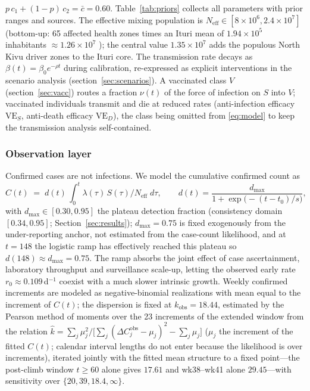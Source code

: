 \documentclass[preprint,12pt,numbers]{elsarticle}
\begin{document}
$p\,c_1+(1-p)\,c_2=\bar c=0.60$. Table~\ref{tab:priors} collects all
parameters with prior ranges and sources. The effective mixing
population is $N_{\mathrm{eff}}\in[8\times10^6,2.4\times10^7]$
(bottom-up: 65 affected health zones times an Ituri mean of
$1.94\times10^5$ inhabitants $\approx1.26\times10^7$
\cite{SSHAP2026,KhethImpilo2026}); the central value $1.35\times10^7$
adds the populous North Kivu driver zones to the Ituri core. The
transmission rate decays as $\beta(t)=\beta_0 e^{-\rho t}$ during
calibration, re-expressed as explicit interventions in the scenario
analysis (section~\ref{sec:scenarios}). A vaccinated class $V$
(section~\ref{sec:vacc}) routes a fraction $\nu(t)$ of the force of
infection on $S$ into $V$; vaccinated individuals transmit and die at
reduced rates (anti-infection efficacy $\mathrm{VE}_S$, anti-death
efficacy $\mathrm{VE}_D$), the class being omitted from \eqref{eq:model}
to keep the transmission analysis self-contained.
\subsubsection{Observation layer}\label{sec:obsmodel}

Confirmed cases are not infections. We model the cumulative confirmed
count as
\begin{equation}\label{eq:obs}
C(t) \;=\; d(t)\,\textstyle\int_0^t \lambda(\tau)\, S(\tau)/N_{\mathrm{eff}}\;d\tau, \qquad
d(t) = \frac{d_{\max}}{1+\exp\!\big(-(t-t_0)/s\big)},
\end{equation}
with $d_{\max}\in[0.30,0.95]$ the plateau detection fraction
(consistency domain $[0.34,0.95]$; Section~\ref{sec:results}); $d_{\max}=0.75$
is fixed exogenously from the under-reporting anchor, not estimated from the
case-count likelihood, and at $t=148$ the logistic ramp has effectively reached
this plateau so $d(148)\approx d_{\max}=0.75$. The ramp
absorbs the joint effect of case ascertainment, laboratory throughput
and surveillance scale-up, letting the observed early rate
$r_0\approx0.109\,$d$^{-1}$ coexist with a much slower intrinsic growth.
Weekly confirmed increments are modeled as negative-binomial realizations
with mean equal to the increment of $C(t)$; the dispersion is fixed at
$k_{\mathrm{obs}}=18.44$, estimated by the Pearson method of moments over
the 23 increments of the extended window from the relation
$\hat k=\sum_j\mu_j^2\big/\bigl[\sum_j(\Delta C_j^{\mathrm{obs}}-\mu_j)^2-\sum_j\mu_j\big]$
($\mu_j$ the increment of the fitted $C(t)$; calendar interval lengths
do not enter because the likelihood is over increments), iterated jointly
with the fitted mean structure to a fixed point---the post-climb window
$t\ge60$ alone gives $17.61$ and wk38--wk41 alone $29.45$---with
sensitivity over $\{20,39,18.4,\infty\}$.
\end{document}
